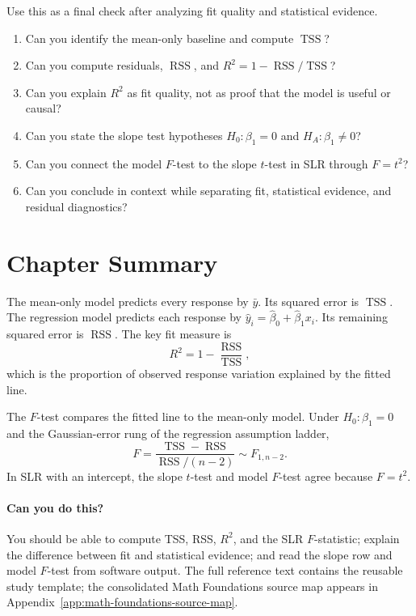 {Use this as a final check after analyzing fit quality and statistical evidence.

\begin{enumerate}
  \item Can you identify the mean-only baseline and compute \(\operatorname{TSS}\)?
  \item Can you compute residuals, \(\operatorname{RSS}\), and \(R^2=1-\operatorname{RSS}/\operatorname{TSS}\)?
  \item Can you explain \(R^2\) as fit quality, not as proof that the model is useful or causal?
  \item Can you state the slope test hypotheses \(H_0:\beta_1=0\) and \(H_A:\beta_1\neq 0\)?
  \item Can you connect the model \(F\)-test to the slope \(t\)-test in SLR through \(F=t^2\)?
  \item Can you conclude in context while separating fit, statistical evidence, and residual diagnostics?
\end{enumerate}
}{
\section{Chapter Summary}

The mean-only model predicts every response by \(\bar{y}\).  Its squared error is \(\operatorname{TSS}\).  The regression model predicts each response by \(\widehat{y}_i=\widehat{\beta}_0+\widehat{\beta}_1x_i\).  Its remaining squared error is \(\operatorname{RSS}\).  The key fit measure is
\begin{equation}
  R^2=1-\frac{\operatorname{RSS}}{\operatorname{TSS}},
\end{equation}
which is the proportion of observed response variation explained by the fitted line.

The $F$-test compares the fitted line to the mean-only model.  Under \(H_0:\beta_1=0\) and the Gaussian-error rung of the regression assumption ladder,
\begin{equation}
  F=\frac{\operatorname{TSS}-\operatorname{RSS}}{\operatorname{RSS}/(n-2)}\sim F_{1,n-2}.
\end{equation}
In SLR with an intercept, the slope $t$-test and model $F$-test agree because \(F=t^2\).

\paragraph{Can you do this?}
You should be able to compute TSS, RSS, \(R^2\), and the SLR $F$-statistic; explain the difference between fit and statistical evidence; and read the slope row and model $F$-test from software output.  The full reference text contains the reusable study template; the consolidated Math Foundations source map appears in Appendix~\ref{app:math-foundations-source-map}.
}
